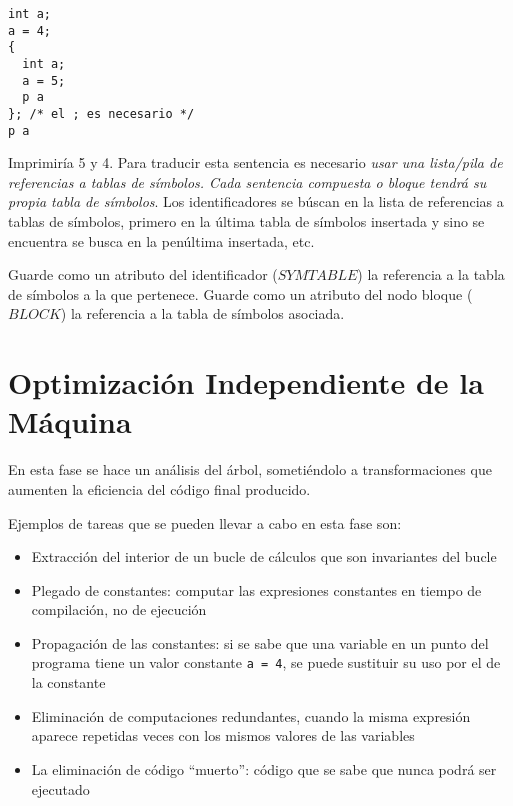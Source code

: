 \begin{verbatim}
int a;
a = 4;
{
  int a;
  a = 5;
  p a
}; /* el ; es necesario */
p a
\end{verbatim}

Imprimiría 5 y 4. Para traducir esta sentencia es necesario 
\emph{usar una lista/pila de referencias a tablas de símbolos. Cada 
sentencia compuesta o bloque tendrá
su propia tabla de símbolos}. Los identificadores se búscan
en la lista de referencias a tablas de símbolos, primero 
en la última tabla de símbolos insertada y sino se encuentra
se busca en la penúltima insertada, etc.

Guarde como un atributo del identificador ($SYMTABLE$) 
la referencia a la tabla de símbolos
a la que pertenece. Guarde como un atributo del nodo bloque ($BLOCK$) 
la referencia a la tabla de símbolos asociada.

\section{Optimización Independiente de la Máquina}
\label{section:optimizacion}
En esta fase se hace un análisis del árbol, sometiéndolo a transformaciones 
que aumenten la eficiencia del código final producido. 

Ejemplos de tareas que se pueden llevar a cabo en esta fase son: 
\begin{itemize}
\item
Extracción del interior de un bucle de cálculos que son invariantes del bucle
\item
Plegado de constantes: computar las expresiones constantes en tiempo de compilación,
no de ejecución
\item
Propagación de las constantes: si se sabe que una variable  en un punto del programa
tiene un valor constante \verb|a = 4|, se puede sustituir su uso por el de la constante
\item
Eliminación de computaciones redundantes, cuando la misma expresión aparece repetidas
veces con los mismos valores de las variables
\item
La eliminación de código ``muerto'': código que se sabe que nunca podrá ser ejecutado
\end{itemize}

